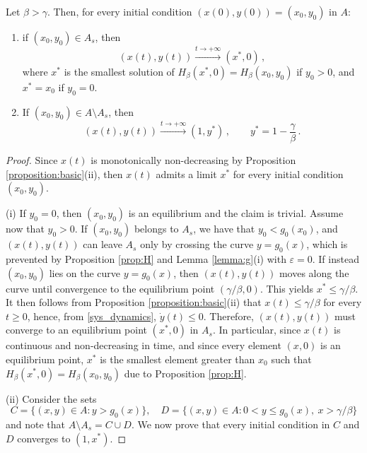 \documentclass[10pt,a4paper]{amsart}
\begin{document}
\begin{theorem}
    Let $\beta > \gamma$. Then, for every initial condition $(x(0),y(0)) = (x_0,y_0)$ in $A$:
    \begin{enumerate}[label=(\roman*)]
        \item if $(x_0, y_0)\in A_s$, then $$(x(t), y(t)) \xrightarrow{t \to + \infty} (x^*, 0)\,,$$ where $x^*$ is the smallest solution of $H_\beta(x^*, 0) = H_\beta(x_0, y_0)$ if $y_0>0$, and $x^* = x_0$ if $y_0 = 0$.
        \item If $(x_0, y_0) \in A \setminus A_s$, then $$(x(t), y(t)) \xrightarrow{t \to + \infty} (1, y^*)\,, \qquad y^* = \displaystyle 1-\frac{\gamma}{\beta}\,.$$
    \end{enumerate}
\end{theorem}

\begin{proof}
Since $x(t)$ is monotonically non-decreasing by Proposition \ref{proposition:basic}(ii), then $x(t)$ admits a limit $x^*$ for every initial condition $(x_0,y_0)$. 

(i) If $y_0 = 0$, then $(x_0,y_0)$ is an equilibrium and the claim is trivial. Assume now that $y_0>0$. If $(x_0,y_0)$ belongs to $A_s$, we have that $y_0 < g_0(x_0)$, and $(x(t),y(t))$ can leave $A_s$ only by crossing the curve $y = g_0(x)$, which is prevented by Proposition \ref{prop:H} and Lemma \ref{lemma:g}(i) with $\varepsilon = 0$. If instead $(x_0,y_0)$ lies on the curve $y = g_0(x)$, then $(x(t),y(t))$ moves along the curve until convergence to the equilibrium point $(\gamma/\beta,0)$. This yields $x^* \le \gamma / \beta$. It then follows from Proposition \ref{proposition:basic}(ii) that $x(t) \le \gamma/\beta$ for every $t \ge 0$, hence, from \eqref{sys_dynamics}, $\dot y(t) \le 0$. Therefore, $(x(t),y(t))$ must converge to an equilibrium point $(x^*,0)$ in $A_s$. In particular, since $x(t)$ is continuous and non-decreasing in time, and since every element $(x,0)$ is an equilibrium point, $x^*$ is the smallest element greater than $x_0$ such that $H_\beta(x^*,0) = H_\beta(x_0,y_0)$ due to Proposition \ref{prop:H}.

(ii) Consider the sets $$C = \{(x,y) \in A: y > g_0(x)\}, \quad D = \{(x,y) \in A: 0 < y \le g_0(x), \ x > \gamma/\beta\}$$
and note that $A \setminus A_s = C \cup D$. We now prove that every initial condition in $C$ and $D$ converges to $(1,x^*)$. 


\end{proof}
\end{document}
